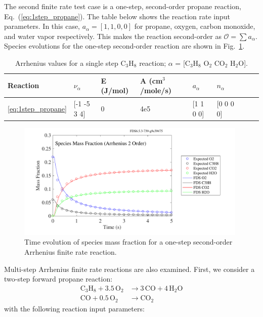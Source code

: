 \documentclass[11pt]{book}
\begin{document}
The second finite rate test case is a one-step, second-order propane reaction, Eq.~(\ref{eq:1step_propane}). The table below shows the reaction rate input parameters. In this case, $a_{\alpha}=[1,1,0,0]$  for propane, oxygen, carbon monoxide, and water vapor respectively. This makes the reaction second-order as $\mathcal{O}=\sum a_{\alpha}$. Species evolutions for the one-step second-order reaction are shown in Fig.~\ref{fig:Arrhenius_2Order_1step}.
\begin{table}[ht]
\begin{center}
\caption[Arrhenius values for a single step C$_3$H$_8$ reaction]{Arrhenius values for a single step C$_3$H$_8$ reaction; $\alpha$ = [$\mathrm{C_3H_8}$ $\mathrm{O_2}$ $\mathrm{CO_2}$ $\mathrm{H_2O}$].}
\label{single_step_c3h8}
\begin{tabular}{|l|l|l|l|l|l|l|l|l|}
\hline Reaction & $\nu_{\alpha}$ & E (J/mol) & A (cm$^3$/mole/s) & $a_{\alpha}$ & $n_{\alpha}$  \\ \hline \hline
\ref{eq:1step_propane} & [-1 -5 3 4] & 0 & 4e5 & [1 1 0 0] & [0 0 0 0] \\ \hline
\end{tabular}
\end{center}
\end{table}
\begin{figure}[h!]
\centering
\includegraphics[height=2.2in]{SCRIPT_FIGURES/reactionrate_arrhenius_2order_1step}
\caption[Species evolution in a 2-order 1-step finite rate reaction]{Time evolution of species mass fraction for a one-step second-order Arrhenius finite rate reaction.}
\label{fig:Arrhenius_2Order_1step}
\end{figure}
Multi-step Arrhenius finite rate reactions are also examined. First, we consider a two-step forward propane reaction:
\begin{subequations}
\begin{align}
\label{eq:2step_propane_a}
\mathrm{C_3H_8+3.5 \, O_2} &\rightarrow  \mathrm{3 \, CO + 4 \, H_2O} \\
\label{eq:2step_propane_b}
\mathrm{CO+0.5 \, O_2} &\rightarrow \mathrm{CO_2}
\end{align}
\end{subequations}
with the following reaction input parameters:
\end{document}
